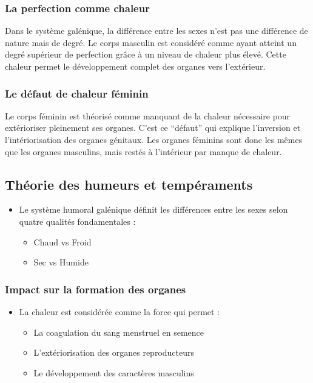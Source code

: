 \documentclass[
  letterpaper,
  DIV=11,
  numbers=noendperiod]{scrreprt}
\providecommand{\tightlist}{%
  \setlength{\itemsep}{0pt}\setlength{\parskip}{0pt}}\usepackage{longtable,booktabs,array}
\begin{document}
\subsubsection{La perfection comme
chaleur}\label{la-perfection-comme-chaleur}

Dans le système galénique, la différence entre les sexes n'est pas une
différence de nature mais de degré. Le corps masculin est considéré
comme ayant atteint un degré supérieur de perfection grâce à un niveau
de chaleur plus élevé. Cette chaleur permet le développement complet des
organes vers l'extérieur.

\subsubsection{Le défaut de chaleur
féminin}\label{le-duxe9faut-de-chaleur-fuxe9minin}

Le corps féminin est théorisé comme manquant de la chaleur nécessaire
pour extérioriser pleinement ses organes. C'est ce ``défaut'' qui
explique l'inversion et l'intériorisation des organes génitaux. Les
organes féminins sont donc les mêmes que les organes masculins, mais
restés à l'intérieur par manque de chaleur.

\subsection{Théorie des humeurs et
tempéraments}\label{thuxe9orie-des-humeurs-et-tempuxe9raments}

\begin{itemize}
\tightlist
\item
  Le système humoral galénique définit les différences entre les sexes
  selon quatre qualités fondamentales :

  \begin{itemize}
  \tightlist
  \item
    Chaud vs Froid
  \item
    Sec vs Humide
  \end{itemize}
\end{itemize}

\subsubsection{Impact sur la formation des
organes}\label{impact-sur-la-formation-des-organes}

\begin{itemize}
\tightlist
\item
  La chaleur est considérée comme la force qui permet :

  \begin{itemize}
  \tightlist
  \item
    La coagulation du sang menstruel en semence
  \item
    L'extériorisation des organes reproducteurs
  \item
    Le développement des caractères masculins
  \end{itemize}
\end{itemize}
\end{document}
